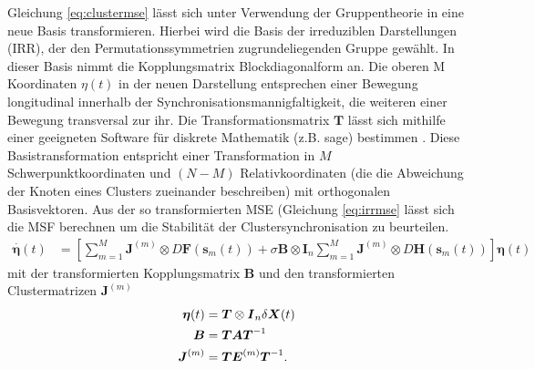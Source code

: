 Gleichung \ref{eq:clustermse} lässt sich unter Verwendung der Gruppentheorie in eine neue Basis transformieren. Hierbei wird die Basis der irreduziblen Darstellungen (IRR), der den Permutationssymmetrien zugrundeliegenden Gruppe gewählt. In dieser Basis nimmt die Kopplungsmatrix Blockdiagonalform an. Die oberen M Koordinaten $\eta(t)$ in der neuen Darstellung entsprechen einer Bewegung longitudinal innerhalb der Synchronisationsmannigfaltigkeit, die weiteren einer Bewegung transversal zur ihr. Die Transformationsmatrix $\boldsymbol{T}$ lässt sich mithilfe einer geeigneten Software für diskrete Mathematik (z.B. sage) bestimmen \citep{sagenotebook}. Diese Basistransformation entspricht einer Transformation in $M$ Schwerpunktkoordinaten und $(N-M)$ Relativkoordinaten (die die Abweichung der Knoten eines Clusters zueinander beschreiben) mit orthogonalen Basisvektoren.
Aus der so transformierten MSE (Gleichung \ref{eq:irrmse} lässt sich die MSF berechnen um die Stabilität der Clustersynchronisation zu beurteilen.
\begin{align}
	\label{eq:irrmse}
		\overset{\cdot}{\boldsymbol{\eta}}(t)&=
				\left[\sum_{m=1}^{M} \boldsymbol{J}^{(m)} \otimes D\boldsymbol{F}(\boldsymbol{s}_m(t))+\sigma\boldsymbol{B}\otimes \boldsymbol{I}_n\sum_{m=1}^{M} \boldsymbol{J}^{(m)}\otimes D\boldsymbol{H}(\boldsymbol{s}_m(t))\right]\boldsymbol{\eta}(t)
		\end{align}
		mit der transformierten Kopplungsmatrix $\boldsymbol{B}$ und den transformierten Clustermatrizen $\boldsymbol{J}^{(m)}$
		\begin{align}
				 \boldsymbol{\eta}(t)&=\boldsymbol{T}\otimes\boldsymbol{I}_n\delta\boldsymbol{X}(t)
				\\\notag \boldsymbol{B}&=\boldsymbol{T}\boldsymbol{A}\boldsymbol{T}^{-1}
				\\\notag \boldsymbol{J}^{(m)}&=\boldsymbol{T}\boldsymbol{E}^{(m)}\boldsymbol{T}^{-1}.
		\end{align}
		




